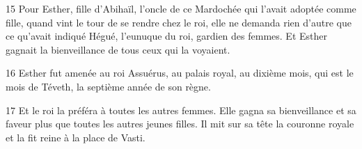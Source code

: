 

15 Pour Esther, fille d’Abihaïl, l’oncle de ce Mardochée qui l’avait adoptée comme fille, quand vint le tour de se rendre chez le roi, elle ne demanda rien d’autre que ce qu’avait indiqué Hégué, l’eunuque du roi, gardien des femmes. Et Esther gagnait la bienveillance de tous ceux qui la voyaient.

16 Esther fut amenée au roi Assuérus, au palais royal, au dixième mois, qui est le mois de Téveth, la septième année de son règne.

17 Et le roi la préféra à toutes les autres femmes. Elle gagna sa bienveillance et sa faveur plus que toutes les autres jeunes filles. Il mit sur sa tête la couronne royale et la fit reine à la place de Vasti.

